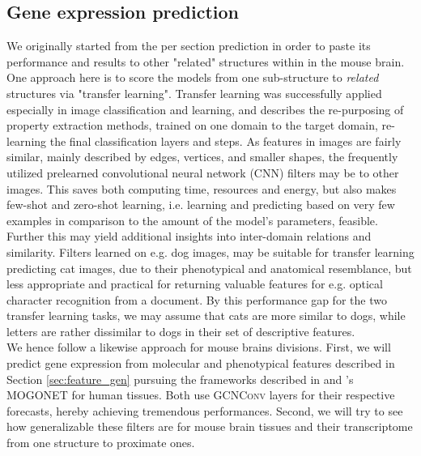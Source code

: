 \documentclass[]{article}
\begin{document}
\subsection{Gene expression prediction}
\label{sec:results_genexp}
We originally started from the per section prediction in order to paste its performance and results to other "related" structures within in the mouse brain. One approach here is to score the models from one sub-structure to \textit{related} structures via "transfer learning". Transfer learning was successfully applied especially in image classification and learning, and describes the re-purposing of property extraction methods, trained on one domain to the target domain, re-learning the final classification layers and steps. As features in images are fairly similar, mainly described by edges, vertices, and smaller shapes, the frequently utilized prelearned convolutional neural network (CNN) filters may be to other images. This saves both computing time, resources and energy, but also makes few-shot and zero-shot learning, i.e. learning and predicting based on very few examples in comparison to the amount of the model's parameters, feasible. Further this may yield additional insights into inter-domain relations and similarity. Filters learned on e.g. dog images, may be suitable for transfer learning predicting cat images, due to their phenotypical and anatomical resemblance, but less appropriate and practical for returning valuable features for e.g. optical character recognition from a document. By this performance gap for the two transfer learning tasks, we may assume that cats are more similar to dogs, while letters are rather dissimilar to dogs in their set of descriptive features. \\

We hence follow a likewise approach for mouse brains divisions. First, we will predict gene expression from molecular and phenotypical features described in Section \ref{sec:feature_gen} pursuing the frameworks described in \citet{schulte2021integration} and \citet{wang2021mogonet}'s MOGONET for human tissues. Both use \textsc{GCNConv} layers for their respective forecasts, hereby achieving tremendous performances. Second, we will try to see how generalizable these filters are for mouse brain tissues and their transcriptome from one structure to proximate ones.\\
\end{document}
